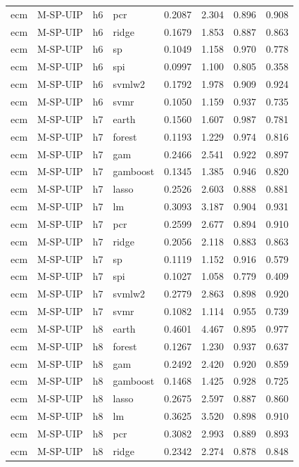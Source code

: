 \begin{ThreePartTable}
\begin{longtable}[t]{llclcccc}
ecm & M-SP-UIP & h6 & pcr & 0.2087 & 2.304 & 0.896 & 0.908\\
ecm & M-SP-UIP & h6 & ridge & 0.1679 & 1.853 & 0.887 & 0.863\\
ecm & M-SP-UIP & h6 & sp & 0.1049 & 1.158 & 0.970 & 0.778\\
ecm & M-SP-UIP & h6 & spi & 0.0997 & 1.100 & 0.805 & 0.358\\
ecm & M-SP-UIP & h6 & svmlw2 & 0.1792 & 1.978 & 0.909 & 0.924\\
ecm & M-SP-UIP & h6 & svmr & 0.1050 & 1.159 & 0.937 & 0.735\\
\addlinespace
ecm & M-SP-UIP & h7 & earth & 0.1560 & 1.607 & 0.987 & 0.781\\
ecm & M-SP-UIP & h7 & forest & 0.1193 & 1.229 & 0.974 & 0.816\\
ecm & M-SP-UIP & h7 & gam & 0.2466 & 2.541 & 0.922 & 0.897\\
ecm & M-SP-UIP & h7 & gamboost & 0.1345 & 1.385 & 0.946 & 0.820\\
ecm & M-SP-UIP & h7 & lasso & 0.2526 & 2.603 & 0.888 & 0.881\\
ecm & M-SP-UIP & h7 & lm & 0.3093 & 3.187 & 0.904 & 0.931\\
ecm & M-SP-UIP & h7 & pcr & 0.2599 & 2.677 & 0.894 & 0.910\\
ecm & M-SP-UIP & h7 & ridge & 0.2056 & 2.118 & 0.883 & 0.863\\
ecm & M-SP-UIP & h7 & sp & 0.1119 & 1.152 & 0.916 & 0.579\\
ecm & M-SP-UIP & h7 & spi & 0.1027 & 1.058 & 0.779 & 0.409\\
ecm & M-SP-UIP & h7 & svmlw2 & 0.2779 & 2.863 & 0.898 & 0.920\\
ecm & M-SP-UIP & h7 & svmr & 0.1082 & 1.114 & 0.955 & 0.739\\
\addlinespace
ecm & M-SP-UIP & h8 & earth & 0.4601 & 4.467 & 0.895 & 0.977\\
ecm & M-SP-UIP & h8 & forest & 0.1267 & 1.230 & 0.937 & 0.637\\
ecm & M-SP-UIP & h8 & gam & 0.2492 & 2.420 & 0.920 & 0.859\\
ecm & M-SP-UIP & h8 & gamboost & 0.1468 & 1.425 & 0.928 & 0.725\\
ecm & M-SP-UIP & h8 & lasso & 0.2675 & 2.597 & 0.887 & 0.860\\
ecm & M-SP-UIP & h8 & lm & 0.3625 & 3.520 & 0.898 & 0.910\\
ecm & M-SP-UIP & h8 & pcr & 0.3082 & 2.993 & 0.889 & 0.893\\
ecm & M-SP-UIP & h8 & ridge & 0.2342 & 2.274 & 0.878 & 0.848\\

\end{longtable}
\end{ThreePartTable}
